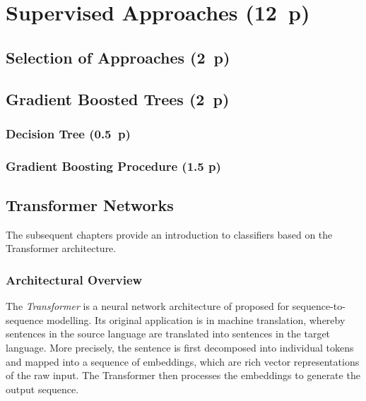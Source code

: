 \newpage
\section{Supervised Approaches (12~p)}\label{sec:supervised-approaches}

\subsection{Selection of Approaches (2~p)}\label{sec:selection-of-approaches}

\subsection{Gradient Boosted Trees (2~p)}\label{sec:gradient-boosted-trees}

\subsubsection{Decision Tree (0.5~p)}\label{sec:decision-tree}

\subsubsection{Gradient Boosting
  Procedure (1.5 p)}\label{sec:gradient-boosting-procedure}

\subsection{Transformer Networks}\label{sec:transformer-networks}

The subsequent chapters provide an introduction to classifiers based on the Transformer architecture.

\subsubsection{Architectural Overview}\label{sec:architectural-overview}

The \emph{Transformer} is a neural network architecture of \textcite[][6002--6006]{vaswaniAttentionAllYou2017} proposed for sequence-to-sequence modelling. Its original application is in machine translation, whereby sentences in the source language are translated into sentences in the target language. More precisely, the sentence is first decomposed into individual \glspl{token} and mapped into a sequence of \glspl{embedding}, which are rich vector representations of the raw input. The Transformer then processes the \glspl{embedding} to generate the output sequence. 

